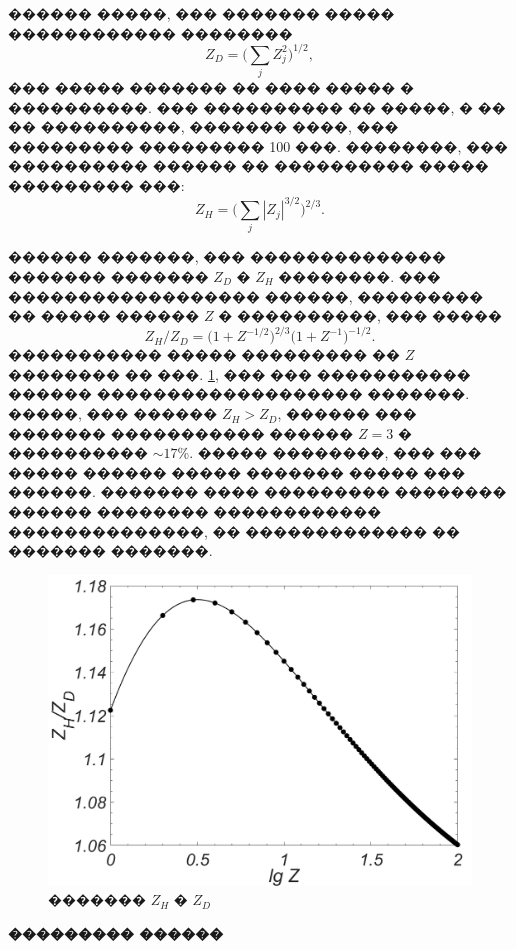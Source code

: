 \documentclass[12pt,titlepage]{article}
\begin{document}
������ �����, ��� ������� ����� ������������ ��������
\begin{equation}
    \label{Debye}
    Z_D = \bigg( \sum_j Z_j^2 \bigg)^{1/2},
\end{equation}
��� ����� ������� �� ���� ����� � ����������. ��� ���������� �� �����, � �� �� ����������, ������� ����, ��� ��������� ��������� 100 ���. ��������, ��� ���������� ������ �� ���������� ����� ��������� ���:
\begin{equation}
    \label{Holtsmark}
    Z_H = \bigg( \sum_j |Z_j|^{3/2} \bigg)^{2/3}.
\end{equation}

������ �������, ��� �������������� ������� ������� $Z_D$ � $Z_H$ ��������. ��� ������������������ ������, ��������� �� ����� ������ $Z$ � ����������, ��� �����
\begin{equation}
    \label{charge_comp}
    Z_H/Z_D = \big(1 + Z^{-1/2}\big)^{2/3} \big(1 + Z^{-1}\big)^{-1/2}.
\end{equation}
����������� ����� ��������� �� $Z$ �������� �� ���. \ref{figChargeRel}, ��� ��� ����������� ������ ������������������� �������. �����, ��� ������ $Z_H > Z_D$, ������ ��� ������� ����������� ������ $Z = 3$ � ���������� $\sim17$\%.
����� ��������, ��� ��� ����� ������ ����� ������� ����� ��� ������.
������� ���� ��������� �������� ������ �������� ������������ ��������������, �� ������������� �� ������� �������.

\begin{figure}[h!]
\centerline{
\includegraphics[width=0.7\linewidth]{Charge_relation.png}
}
\caption{������� $Z_H$ � $Z_D$} \label{figChargeRel}
\end{figure}

\bigskip
\textbf{��������� ������}
\end{document}
